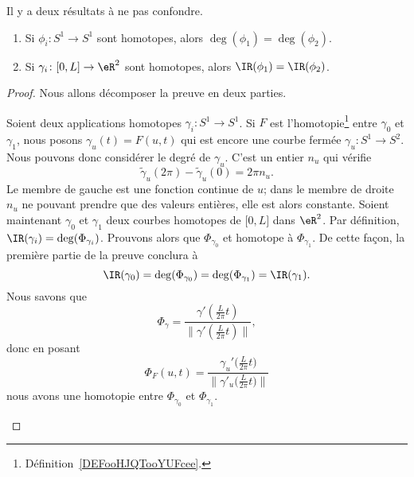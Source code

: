\begin{proposition}      \label{PROPooZIAKooHqtnZj}
	Il y a deux résultats à ne pas confondre.
	\begin{enumerate}
		\item   \label{ITEMooLEHFooXEyTHY}
		      Si \( \phi_i\colon S^1\to S^1\) sont homotopes, alors \( \deg(\phi_1)=\deg(\phi_2)\).
		\item
		      Si \(\gamma_i\colon \mathopen[ 0 , L \mathclose]\to \eR^2 \) sont homotopes, alors \( \IR(\phi_1)=\IR(\phi_2)\).
	\end{enumerate}
\end{proposition}

\begin{proof}
	Nous allons décomposer la preuve en deux parties.
	\begin{subproof}
		Soient deux applications homotopes \( \gamma_i\colon S^1\to S^1\). Si \( F\) est l'homotopie\footnote{Définition~\ref{DEFooHJQTooYUFcee}.} entre \( \gamma_0\) et \( \gamma_1\), nous posons \( \gamma_u(t)=F(u,t)\) qui est encore une courbe fermée \( \gamma_u\colon S^1\to S^2\). Nous pouvons donc considérer le degré de \( \gamma_u\). C'est un entier \( n_u\) qui vérifie
		\begin{equation}
			\tilde \gamma_u(2\pi)-\tilde \gamma_u(0)=2\pi n_u.
		\end{equation}
		Le membre de gauche est une fonction continue de \( u\); dans le membre de droite \( n_u\) ne pouvant prendre que des valeurs entières, elle est alors constante.
		Soient maintenant \( \gamma_0\) et \( \gamma_1\) deux courbes homotopes de \( \mathopen[ 0 , L \mathclose]\) dans \( \eR^2\). Par définition, \( \IR(\gamma_i)=\deg(\Phi_{\gamma_i})\). Prouvons alors que \( \Phi_{\gamma_0}\) et homotope à \( \Phi_{\gamma_1}\). De cette façon, la première partie de la preuve conclura à
		\begin{equation}
			\IR(\gamma_0)=\deg(\Phi_{\gamma_0})=\deg(\Phi_{\gamma_1})=\IR(\gamma_1).
		\end{equation}
		Nous savons que
		\begin{equation}
			\Phi_{\gamma}=\frac{ \gamma'\left( \frac{ L }{ 2\pi }t \right) }{ \| \gamma'\left( \frac{ L }{ 2\pi }t \right) \| },
		\end{equation}
		donc en posant
		\begin{equation}
			\Phi_F(u,t)=\frac{ \gamma_u'\big( \frac{ L }{ 2\pi }t \big) }{ \| \gamma'_u\big( \frac{ L }{ 2\pi }t \big) \| }
		\end{equation}
		nous avons une homotopie entre \( \Phi_{\gamma_0}\) et \( \Phi_{\gamma_1}\).
	\end{subproof}
\end{proof}

